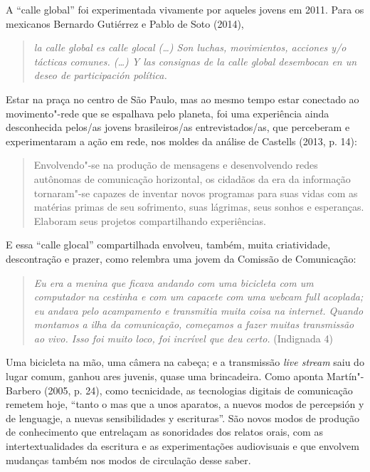 A ``calle global'' foi experimentada vivamente por aqueles jovens em
2011. Para os mexicanos Bernardo Gutiérrez e Pablo de Soto (2014),

\begin{quote}
\emph{la calle global es calle glocal (\ldots{}) Son luchas, movimientos,
acciones y/o tácticas comunes. (\ldots{}) Y las consignas de la calle global
desembocan en un deseo de participación política. }
\end{quote}

Estar na praça no centro de São Paulo, mas ao mesmo tempo estar
conectado ao movimento"-rede que se espalhava pelo planeta, foi uma
experiência ainda desconhecida pelos/as jovens brasileiros/as
entrevistados/as, que perceberam e experimentaram a ação em rede, nos
moldes da análise de Castells (2013, p. 14):

\begin{quote}
Envolvendo"-se na produção de mensagens e desenvolvendo redes autônomas
de comunicação horizontal, os cidadãos da era da informação tornaram"-se
capazes de inventar novos programas para suas vidas com as matérias
primas de seu sofrimento, suas lágrimas, seus sonhos e esperanças.
Elaboram seus projetos compartilhando experiências.
\end{quote}

E essa ``calle glocal'' compartilhada envolveu, também, muita
criatividade, descontração e prazer, como relembra uma jovem da Comissão
de Comunicação:

\begin{quote}
\emph{Eu era a menina que ficava andando com uma bicicleta com um
computador na cestinha e com um capacete com uma webcam full 
acoplada; eu andava pelo acampamento e transmitia muita coisa na
internet. Quando montamos a ilha da comunicação, começamos a fazer
muitas transmissão ao vivo. Isso foi muito loco, foi incrível que deu
certo.} (Indignada 4)
\end{quote}

Uma bicicleta na mão, uma câmera na cabeça; e a transmissão \emph{live
stream} saiu do lugar comum, ganhou ares juvenis, quase uma brincadeira.
Como aponta Martín"-Barbero (2005, p. 24), como tecnicidade, as
tecnologias digitais de comunicação remetem hoje, ``tanto o mas que a
unos aparatos, a nuevos modos de percepsión y de lenguagje, a nuevas
sensibilidades y escrituras''. São novos modos de produção de
conhecimento que entrelaçam as sonoridades dos relatos orais, com as
intertextualidades da escritura e as experimentações audiovisuais e que
envolvem mudanças também nos modos de circulação desse saber.

